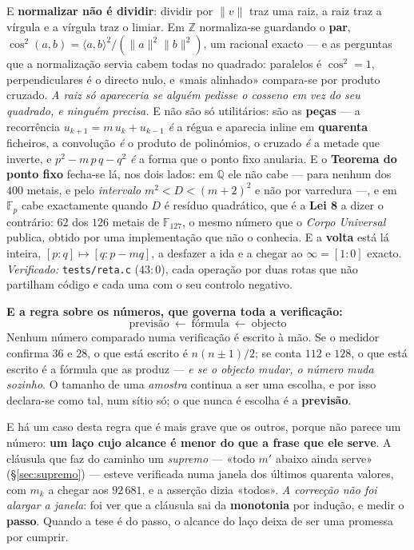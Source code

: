 \documentclass[11pt,a4paper]{article}
\newcommand{\code}[1]{\texttt{\small #1}}
\begin{document}
\medskip
\noindent E \textbf{normalizar não é dividir}: dividir por $\lVert v\rVert$ traz uma raiz,
a raiz traz a vírgula e a vírgula traz o limiar. Em $\mathbb{Z}$ normaliza-se guardando o
\textbf{par}, $\cos^{2}(a,b)=\langle a,b\rangle^{2}/(\lVert a\rVert^{2}\lVert
b\rVert^{2})$, um racional exacto --- e as perguntas que a normalização servia cabem todas
no quadrado: paralelos é $\cos^{2}=1$, perpendiculares é o directo nulo, e «mais alinhado»
compara-se por produto cruzado. \emph{A raiz só apareceria se alguém pedisse o cosseno em
vez do seu quadrado, e ninguém precisa.}
E não são só utilitários: são as \textbf{peças} --- a recorrência $u_{k+1}=m\,u_k+u_{k-1}$
\emph{é} a régua e aparecia inline em \textbf{quarenta} ficheiros, a convolução \emph{é}
o produto de polinómios, o cruzado \emph{é} a metade que inverte, e
$p^{2}-m\,p\,q-q^{2}$ \emph{é} a forma que o ponto fixo anularia.
E o \textbf{Teorema do ponto fixo} fecha-se lá, nos dois lados: em $\mathbb{Q}$ ele não
cabe --- para nenhum dos $400$ metais, e pelo \emph{intervalo} $m^{2}<D<(m+2)^{2}$ e não
por varredura ---, e em $\mathbb{F}_p$ cabe exactamente quando $D$ é resíduo quadrático,
que é a \textbf{Lei 8} a dizer o contrário: $62$ dos $126$ metais de $\mathbb{F}_{127}$,
o mesmo número que o \emph{Corpo Universal} publica, obtido por uma implementação que não
o conhecia. E a \textbf{volta} está lá inteira, $[p:q]\mapsto[q:p-mq]$, a desfazer a ida
e a chegar ao $\infty=[1:0]$ exacto.
\emph{Verificado:} \code{tests/reta.c} ($43{:}0$), cada operação por duas rotas que não
partilham código e cada uma com o seu controlo negativo.

\medskip
\noindent\textbf{E a regra sobre os números, que governa toda a verificação:}
\[
\boxed{\;\text{previsão}\ \longleftarrow\ \text{fórmula}\ \longleftarrow\ \text{objecto}\;}
\]
Nenhum número comparado numa verificação é escrito à mão. Se o medidor confirma $36$ e
$28$, o que está escrito é $n(n\pm1)/2$; se conta $112$ e $128$, o que está escrito é a
fórmula que as produz --- \emph{e se o objecto mudar, o número muda sozinho}. O tamanho
de uma \emph{amostra} continua a ser uma escolha, e por isso declara-se como tal, num
sítio só; o que nunca é escolha é a \textbf{previsão}.

\medskip
\noindent E há um caso desta regra que é mais grave que os outros, porque não parece um
número: \textbf{um laço cujo alcance é menor do que a frase que ele serve}. A cláusula
que faz do caminho um \emph{supremo} --- «todo $m'$ abaixo ainda serve»
(\S\ref{sec:supremo}) --- esteve verificada numa janela dos últimos quarenta valores,
com $m_k$ a chegar aos $92\,681$, e a asserção dizia «todos». \emph{A correcção não foi
alargar a janela}: foi ver que a cláusula sai da \textbf{monotonia} por indução, e medir
o \textbf{passo}. Quando a tese é do passo, o alcance do laço deixa de ser uma promessa
por cumprir.
\end{document}
